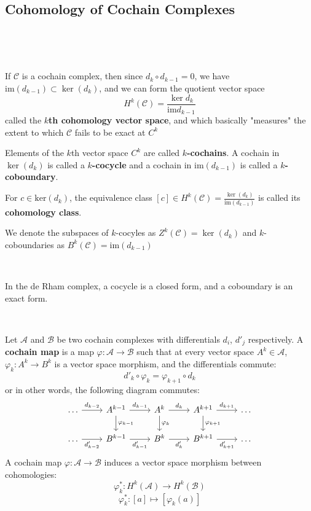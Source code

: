 \documentclass{article}
\begin{document}
\subsection{Cohomology of Cochain Complexes}
\

\begin{definition}
  \

  If $\mathcal{C}$ is a cochain complex, then since $d_k \circ d_{k-1} = 0$, we have $\text{im} (d_{k-1}) \subset \ker (d_k)$, and we can form the quotient vector space $$H^k(\mathcal{C}) = \frac{\ker d_k}{\text{im} d_{k-1}}$$called the \textbf{$k$th cohomology vector space}, and which basically "measures" the extent to which $\mathcal{C}$ fails to be exact at $C^k$

  Elements of the $k$th vector space $C^k$ are called \textbf{$k$-cochains}. A cochain in $\ker(d_k)$ is called a \textbf{$k$-cocycle} and a cochain in $\text{im}(d_{k-1})$ is called a \textbf{$k$-coboundary}.

  For $c \in \text{ker}(d_k)$, the equivalence class $[c] \in H^k(\mathcal{C}) = \frac{\ker(d_k)}{\text{im}(d_{k-1})}$ is called its \textbf{cohomology class}.

  We denote the subspaces of $k$-cocyles as $Z^k(\mathcal{C}) = \ker(d_k)$ and $k$-coboundaries as $B^k(\mathcal{C}) = \text{im}(d_{k-1})$
\end{definition}

\begin{example}
  \

  In the de Rham complex, a cocycle is a closed form, and a coboundary is an exact form.
\end{example}

\begin{definition}
  \

  Let $\mathcal{A}$ and $\mathcal{B}$ be two cochain complexes with differentials $d_i$, $d'_j$ respectively. A \textbf{cochain map} is a map $\varphi: \mathcal{A} \to \mathcal{B}$ such that at every vector space $A^k \in \mathcal{A}$, $\varphi_k: A^k \to B^k$ is a vector space morphism, and the differentials commute: $$d'_k \circ \varphi_k = \varphi_{k+1} \circ d_k$$or in other words, the following diagram commutes: \[
    \begin{tikzcd}
      \dots & A^{k-1} & A^k & A^{k+1} & \dots\\
      \dots & B^{k-1} & B^k & B^{k+1} & \dots
      \arrow[from=1-1, to=1-2, "d_{k-2}"]
      \arrow[from=1-2, to=1-3, "d_{k-1}"]
      \arrow[from=1-3, to=1-4, "d_k"]
      \arrow[from=1-4, to=1-5, "d_{k+1}"]
      \arrow[from=2-1, to=2-2, "d'_{k-2}"']
      \arrow[from=2-2, to=2-3, "d'_{k-1}"']
      \arrow[from=2-3, to=2-4, "d'_k"']
      \arrow[from=2-4, to=2-5, "d'_{k+1}"']
      \arrow[from=1-2, to=2-2, "\varphi_{k-1}"]
      \arrow[from=1-3, to=2-3, "\varphi_k"]
      \arrow[from=1-4, to=2-4, "\varphi_{k+1}"]
  \end{tikzcd}\]A cochain map $\varphi: \mathcal{A} \to \mathcal{B}$ induces a vector space morphism between cohomologies: $$\varphi^*_k: H^k(\mathcal{A}) \to H^k(\mathcal{B})$$$$\varphi^*_k: [a] \mapsto [\varphi_k(a)]$$
\end{definition}
\end{document}
